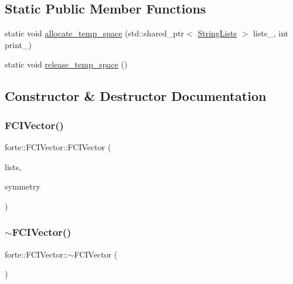 \subsection*{Static Public Member Functions}
\begin{DoxyCompactItemize}
\item 
static void \mbox{\hyperlink{classforte_1_1_f_c_i_vector_ad3aed0f04ae2cb88c0f77c02197f6d02}{allocate\+\_\+temp\+\_\+space}} (std\+::shared\+\_\+ptr$<$ \mbox{\hyperlink{classforte_1_1_string_lists}{String\+Lists}} $>$ lists\+\_\+, int print\+\_\+)
\item 
static void \mbox{\hyperlink{classforte_1_1_f_c_i_vector_a31d51c8fda52541784e15b06ca9ebd45}{release\+\_\+temp\+\_\+space}} ()
\end{DoxyCompactItemize}


\subsection{Constructor \& Destructor Documentation}
\mbox{\label{classforte_1_1_f_c_i_vector_ac11c68d1754586cf203dad0b95a07b86}} 
\subsubsection{\texorpdfstring{F\+C\+I\+Vector()}{FCIVector()}}
{\footnotesize\ttfamily forte\+::\+F\+C\+I\+Vector\+::\+F\+C\+I\+Vector (\begin{DoxyParamCaption}\item[{std\+::shared\+\_\+ptr$<$ \mbox{\hyperlink{classforte_1_1_string_lists}{String\+Lists}} $>$}]{lists,  }\item[{size\+\_\+t}]{symmetry }\end{DoxyParamCaption})}

\mbox{\label{classforte_1_1_f_c_i_vector_a84a8cb8bb781300b63f904bea8a38a60}} 
\subsubsection{\texorpdfstring{$\sim$\+F\+C\+I\+Vector()}{~FCIVector()}}
{\footnotesize\ttfamily forte\+::\+F\+C\+I\+Vector\+::$\sim$\+F\+C\+I\+Vector (\begin{DoxyParamCaption}{ }\end{DoxyParamCaption})}



